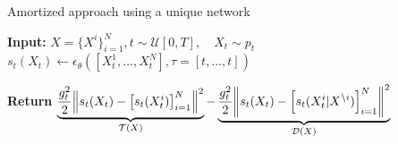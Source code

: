 \documentclass{beamer}
\begin{document}
\begin{frame}{Amortized approach using a unique network}


\begin{figure}
    \centering
    
\end{figure}

\begin{algorithm}[H]
\small
\caption{S$\Omega$I test-time}
\DontPrintSemicolon
\textbf{Input:} $ X = \{X^i\}_{i=1}^N, t \sim \mathcal{U}[0,T], \quad X_t \sim p_t $  \\
$ s_t(X_t) \gets \epsilon_\theta([X_t^1,\dots, X_t^N ], \tau = [t,\dots,t] ) $ 
\For{i = 1 \textbf{to} $N$ }{

$ s_t(X^i_t | X^{\setminus i} ) \gets \epsilon_\theta \left([X^1,..,X^i_t,..,X^N ],\tau = [0,..,t,..,0]\right) $ \tcp{ Conditional}
$ s_t(X^i_t) \gets \epsilon_\theta([X_T^1,\dots,X_t^i,\dots, X_T^N ], \tau = [T,..,t,..,T] ) $ \tcp{Marginal}%
}

\textbf{Return} $ \underbrace{ \frac{g^2_t}{2} \norm{ s_t(X_t) - \left[ s_t(X^i_t) \right]_{i=1}^{N} }^2 }_{\mathcal{T}(X)}- \underbrace{\frac{g^2_t}{2} \norm{ s_t(X_t) - \left[ s_t(X^i_t | X^{\setminus i} ) \right]_{i=1}^{N} }^2 }_{\mathcal{D}(X)}$

\end{algorithm}




\end{frame}





    
\end{document}
